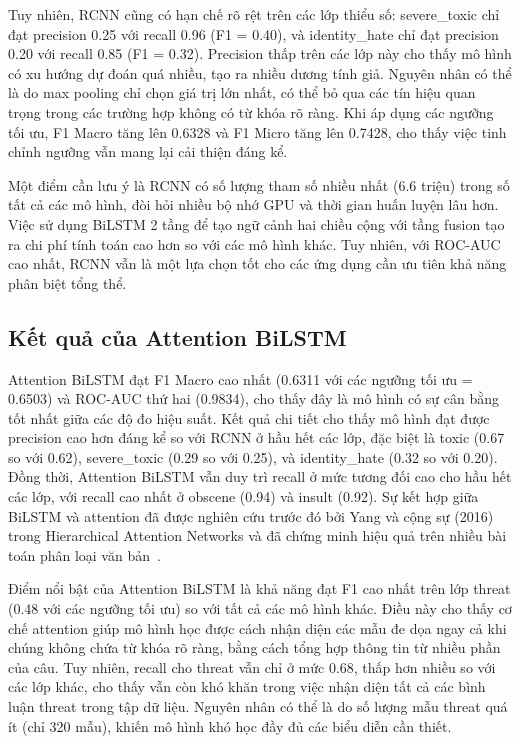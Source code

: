 \documentclass[../BTL.tex]{subfiles}
\begin{document}
Tuy nhiên, RCNN cũng có hạn chế rõ rệt trên các lớp thiểu số: severe\_toxic chỉ đạt precision 0.25 với recall 0.96 (F1 = 0.40), và identity\_hate chỉ đạt precision 0.20 với recall 0.85 (F1 = 0.32). Precision thấp trên các lớp này cho thấy mô hình có xu hướng dự đoán quá nhiều, tạo ra nhiều dương tính giả. Nguyên nhân có thể là do max pooling chỉ chọn giá trị lớn nhất, có thể bỏ qua các tín hiệu quan trọng trong các trường hợp không có từ khóa rõ ràng. Khi áp dụng các ngưỡng tối ưu, F1 Macro tăng lên 0.6328 và F1 Micro tăng lên 0.7428, cho thấy việc tinh chỉnh ngưỡng vẫn mang lại cải thiện đáng kể.

Một điểm cần lưu ý là RCNN có số lượng tham số nhiều nhất (6.6 triệu) trong số tất cả các mô hình, đòi hỏi nhiều bộ nhớ GPU và thời gian huấn luyện lâu hơn. Việc sử dụng BiLSTM 2 tầng để tạo ngữ cảnh hai chiều cộng với tầng fusion tạo ra chi phí tính toán cao hơn so với các mô hình khác. Tuy nhiên, với ROC-AUC cao nhất, RCNN vẫn là một lựa chọn tốt cho các ứng dụng cần ưu tiên khả năng phân biệt tổng thể.

\subsection{Kết quả của Attention BiLSTM}
Attention BiLSTM đạt F1 Macro cao nhất (0.6311 với các ngưỡng tối ưu = 0.6503) và ROC-AUC thứ hai (0.9834), cho thấy đây là mô hình có sự cân bằng tốt nhất giữa các độ đo hiệu suất. Kết quả chi tiết cho thấy mô hình đạt được precision cao hơn đáng kể so với RCNN ở hầu hết các lớp, đặc biệt là toxic (0.67 so với 0.62), severe\_toxic (0.29 so với 0.25), và identity\_hate (0.32 so với 0.20). Đồng thời, Attention BiLSTM vẫn duy trì recall ở mức tương đối cao cho hầu hết các lớp, với recall cao nhất ở obscene (0.94) và insult (0.92). Sự kết hợp giữa BiLSTM và attention đã được nghiên cứu trước đó bởi Yang và cộng sự (2016) trong Hierarchical Attention Networks và đã chứng minh hiệu quả trên nhiều bài toán phân loại văn bản~\cite{yang2016hierarchical}.

Điểm nổi bật của Attention BiLSTM là khả năng đạt F1 cao nhất trên lớp threat (0.48 với các ngưỡng tối ưu) so với tất cả các mô hình khác. Điều này cho thấy cơ chế attention giúp mô hình học được cách nhận diện các mẫu đe dọa ngay cả khi chúng không chứa từ khóa rõ ràng, bằng cách tổng hợp thông tin từ nhiều phần của câu. Tuy nhiên, recall cho threat vẫn chỉ ở mức 0.68, thấp hơn nhiều so với các lớp khác, cho thấy vẫn còn khó khăn trong việc nhận diện tất cả các bình luận threat trong tập dữ liệu. Nguyên nhân có thể là do số lượng mẫu threat quá ít (chỉ 320 mẫu), khiến mô hình khó học đầy đủ các biểu diễn cần thiết.
\end{document}
